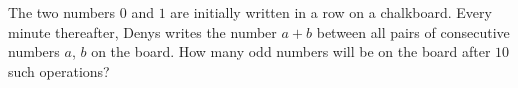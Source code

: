 The two numbers $0$ and $1$ are initially written in a row on a chalkboard. Every minute thereafter, Denys writes the number $a+b$ between all pairs of consecutive numbers $a$, $b$ on the board. How many odd numbers will be on the board after $10$ such operations?
